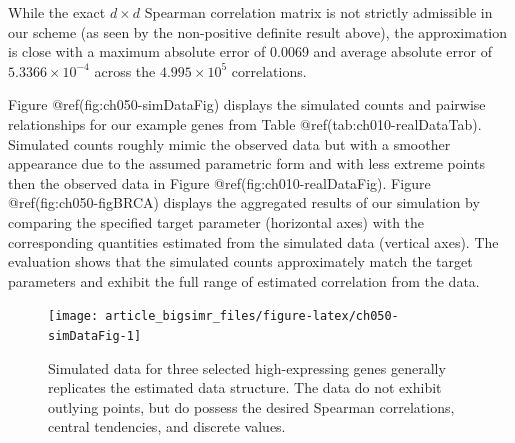 \documentclass[
]{jss}
\begin{document}
While the exact \(d \times d\) Spearman correlation matrix is not
strictly admissible in our scheme (as seen by the non-positive definite
result above), the approximation is close with a maximum absolute error
of 0.0069 and average absolute error of
\ensuremath{5.3366\times 10^{-4}} across the
\ensuremath{4.995\times 10^{5}} correlations.

\begin{CodeChunk}
\end{CodeChunk}

Figure @ref(fig:ch050-simDataFig) displays the simulated counts and
pairwise relationships for our example genes from Table
@ref(tab:ch010-realDataTab). Simulated counts roughly mimic the observed
data but with a smoother appearance due to the assumed parametric form
and with less extreme points then the observed data in Figure
@ref(fig:ch010-realDataFig). Figure @ref(fig:ch050-figBRCA) displays the
aggregated results of our simulation by comparing the specified target
parameter (horizontal axes) with the corresponding quantities estimated
from the simulated data (vertical axes). The evaluation shows that the
simulated counts approximately match the target parameters and exhibit
the full range of estimated correlation from the data.

\begin{CodeChunk}
\begin{figure}

{\centering \texttt{[image: article\_bigsimr\_files/figure-latex/ch050-simDataFig-1]} 

}

\caption[Simulated data for three selected high-expressing genes generally replicates the estimated data structure]{Simulated data for three selected high-expressing genes generally replicates the estimated data structure. The data do not exhibit outlying points, but do possess the desired Spearman correlations, central tendencies, and discrete values.}\label{fig:ch050-simDataFig}
\end{figure}
\end{CodeChunk}
\end{document}
